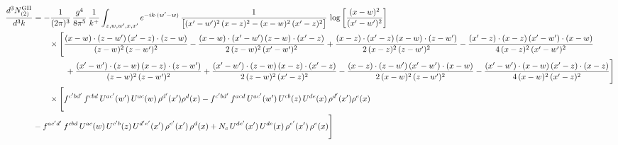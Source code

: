 \documentclass[10pt]{article}
\begin{document}
\begin{align}
\frac{d^{3}N^{\rm GII}_{(2)}}{d^{3}k}&=-\frac{1}{(2\pi)^{3}}\,\frac{g^{4}}{8\pi^{5}}\,\frac{1}{k^{+}}\int_{z,w,w^{\prime},x,x^{\prime}}e^{-ik\cdot(w^{\prime}-w)}\,\frac{1}{\big[(x^{\prime}-w^{\prime})^{2}\,(x-z)^{2}-(x-w)^{2}\,(x^{\prime}-z)^{2}\big]}\,\log\left[\frac{(x-w)^{2}}{(x^{\prime}-w^{\prime})^{2}}\right]\notag\\
&\qquad\times\Bigg[\frac{(x-w)\cdot(z-w^{\prime})\,(x^{\prime}-z)\cdot(z-w)}{(z-w)^{2}\,(z-w^{\prime})^{2}}-\frac{(x-w)\cdot(x^{\prime}-w^{\prime})\,(z-w)\cdot(x^{\prime}-z)}{2\,(z-w)^{2}\,(x^{\prime}-w^{\prime})^{2}}+\frac{(x-z)\cdot(x^{\prime}-z)\,(x-w)\cdot(z-w^{\prime})}{2\,(x-z)^{2}\,(z-w^{\prime})^{2}}-\frac{(x^{\prime}-z)\cdot(x-z)\,(x^{\prime}-w^{\prime})\cdot(x-w)}{4\,(x-z)^{2}\,(x^{\prime}-w^{\prime})^{2}}\notag\\&\qquad\qquad+\frac{(x^{\prime}-w^{\prime})\cdot(z-w)\,(x-z)\cdot(z-w^{\prime})}{(z-w)^{2}\,(z-w^{\prime})^{2}}+\frac{(x^{\prime}-w^{\prime})\cdot(z-w)\,(x-z)\cdot(x^{\prime}-z)}{2\,(z-w)^{2}\,(x^{\prime}-z)^{2}}-\frac{(x-z)\cdot(z-w^{\prime})\,(x^{\prime}-w^{\prime})\cdot(x-w)}{2\,(x-w)^{2}\,(z-w^{\prime})^{2}}-\frac{(x^{\prime}-w^{\prime})\cdot(x-w)\,(x^{\prime}-z)\cdot(x-z)}{4\,(x-w)^{2}\,(x^{\prime}-z)^{2}}\Bigg]\notag\\
&\qquad\times\Bigg[f^{c^{\prime}bd^{\prime}}\,f^{cbd}\, U^{ac^{\prime}}(w^{\prime})\,U^{ac}(w)\,\rho^{d^{\prime}}(x^{\prime})\rho^{d}(x)- f^{c^{\prime}bd^{\prime}}\,f^{acd}\,U^{ac^{\prime}}(w^{\prime})\,U^{cb}(z)\,U^{de}(x)\,\rho^{d^{\prime}}(x^{\prime})\rho^{e}(x) \notag \\ & -f^{ac^{\prime}d^{\prime}}\,f^{cbd}\,U^{ac}(w)\,U^{c^{\prime}b}(z)\,U^{d^{\prime}e^{\prime}}(x^{\prime})\,\rho^{e^{\prime}}(x^{\prime})\,\rho^{d}(x) +N_{c}\,U^{de^{\prime}}(x^{\prime})\,U^{de}(x)\,\rho^{e^{\prime}}(x^{\prime})\,\rho^{e}(x)\Bigg]
\end{align}
\end{document}
